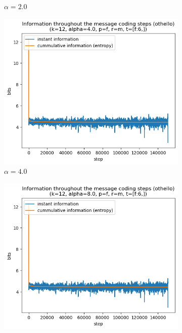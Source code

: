 \documentclass{article}
\begin{document}
\begin{figure}
\begin{subfigure}[b]{0.3\textwidth}
\begin{center}
        \end{center}
        \caption{$\alpha = 2.0$}
        \label{fig:results-alpha-other-2.0}
    \end{subfigure}
    \hfill
    \begin{subfigure}[b]{0.3\textwidth}
        \begin{center}
            \includegraphics[width=1.0\linewidth]{../scripts/images/othello_12_4.0_f_m_[f:6,].png}
        \end{center}
        \caption{$\alpha = 4.0$}
        \label{fig:results-alpha-other-4.0}
    \end{subfigure}
    \hfill
    \begin{subfigure}[b]{0.3\textwidth}
        \begin{center}
            \includegraphics[width=1.0\linewidth]{../scripts/images/othello_12_8.0_f_m_[f:6,].png}

\end{center}
\end{subfigure}
\end{figure}
\end{document}
